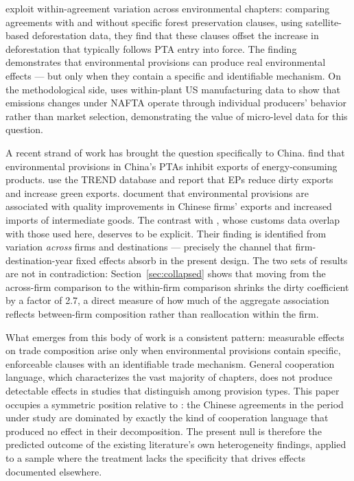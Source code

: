 \documentclass[12pt]{article}
\begin{document}
\citet{abman2024} exploit within-agreement variation across environmental chapters: comparing agreements with and without specific forest preservation clauses, using satellite-based deforestation data, they find that these clauses offset the increase in deforestation that typically follows PTA entry into force. The finding demonstrates that environmental provisions can produce real environmental effects --- but only when they contain a specific and identifiable mechanism. On the methodological side, \citet{cherniwchan2017} uses within-plant US manufacturing data to show that emissions changes under NAFTA operate through individual producers' behavior rather than market selection, demonstrating the value of micro-level data for this question.

A recent strand of work has brought the question specifically to China. \citet{yue2024} find that environmental provisions in China's PTAs inhibit exports of energy-consuming products. \citet{zhusun2026} use the TREND database and report that EPs reduce dirty exports and increase green exports. \citet{zhusun2025} document that environmental provisions are associated with quality improvements in Chinese firms' exports and increased imports of intermediate goods. The contrast with \citet{zhusun2026}, whose customs data overlap with those used here, deserves to be explicit. Their finding is identified from variation \emph{across} firms and destinations --- precisely the channel that firm-destination-year fixed effects absorb in the present design. The two sets of results are not in contradiction: Section~\ref{sec:collapsed} shows that moving from the across-firm comparison to the within-firm comparison shrinks the dirty coefficient by a factor of 2.7, a direct measure of how much of the aggregate association reflects between-firm composition rather than reallocation within the firm.

What emerges from this body of work is a consistent pattern: measurable effects on trade composition arise only when environmental provisions contain specific, enforceable clauses with an identifiable trade mechanism. General cooperation language, which characterizes the vast majority of chapters, does not produce detectable effects in studies that distinguish among provision types. This paper occupies a symmetric position relative to \citet{brandi2020}: the Chinese agreements in the period under study are dominated by exactly the kind of cooperation language that produced no effect in their decomposition. The present null is therefore the predicted outcome of the existing literature's own heterogeneity findings, applied to a sample where the treatment lacks the specificity that drives effects documented elsewhere.
\end{document}
